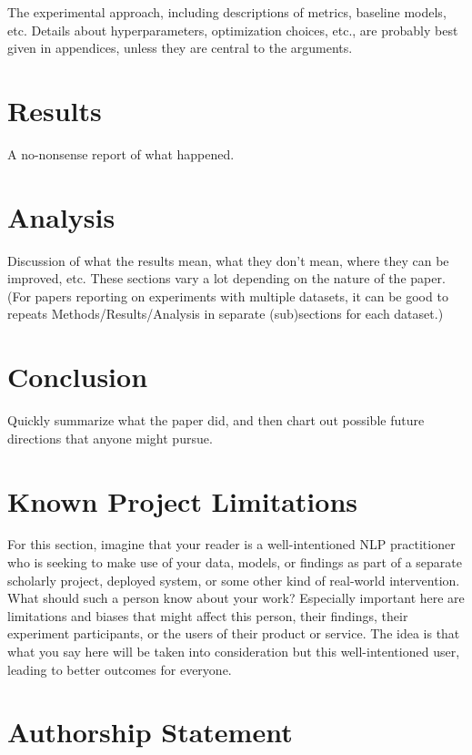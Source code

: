 \documentclass[11pt]{article}
\begin{document}
The experimental approach, including descriptions of metrics, baseline models, etc. Details about hyperparameters, optimization choices, etc., are probably best given in appendices, unless they are central to the arguments.

\section{Results} 

A no-nonsense report of what happened.

\section{Analysis} 

Discussion of what the results mean, what they don’t mean, where they can be improved, etc. These sections vary a lot depending on the nature of the paper. (For papers reporting on experiments with multiple datasets, it can be good to repeats Methods/Results/Analysis in separate (sub)sections for each dataset.)

\section{Conclusion} 

Quickly summarize what the paper did, and then chart out possible future directions that anyone might pursue.

\section*{Known Project Limitations}

For this section, imagine that your reader is a well-intentioned NLP practitioner who is seeking to make use of your data, models, or findings as part of a separate scholarly project, deployed system, or some other kind of real-world intervention. What should such a person know about your work? Especially important here are limitations and biases that might affect this person, their findings, their experiment participants, or the users of their product or service. The idea is that what you say here will be taken into consideration but this well-intentioned user, leading to better outcomes for everyone.

\section*{Authorship Statement}
\end{document}
